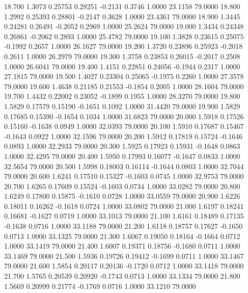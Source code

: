   18.700   1.3073   0.25753   0.28251  -0.2131   0.3746   1.0000  23.1158  79.0000
  18.800   1.2992   0.25393   0.28801  -0.2147   0.3628   1.0000  23.4361  79.0000
  18.900   1.3445   0.24281   0.26491  -0.2052   0.2969   1.0000  25.2624  79.0000
  19.000   1.3434   0.24348   0.26861  -0.2062   0.2893   1.0000  25.4782  79.0000
  19.100   1.3828   0.23615   0.25075  -0.1992   0.2657   1.0000  26.1627  79.0000
  19.200   1.3720   0.23896   0.25923  -0.2018   0.2611   1.0000  26.2979  79.0000
  19.300   1.3758   0.23853   0.26015  -0.2017   0.2508   1.0000  26.6041  79.0000
  19.400   1.4151   0.22851   0.24056  -0.1944   0.2317   1.0000  27.1815  79.0000
  19.500   1.4027   0.23304   0.25065  -0.1975   0.2260   1.0000  27.3578  79.0000
  19.600   1.4638   0.21185   0.21553  -0.1854   0.2005   1.0000  28.1604  79.0000
  19.700   1.4432   0.22002   0.23052  -0.1899   0.1955   1.0000  28.3270  79.0000
  19.800   1.5829   0.17579   0.15190  -0.1651   0.1092   1.0000  31.4420  79.0000
  19.900   1.5829   0.17685   0.15390  -0.1654   0.1034   1.0000  31.6823  79.0000
  20.000   1.5918   0.17526   0.15160  -0.1638   0.0949   1.0000  32.0393  79.0000
  20.100   1.5910   0.17687   0.15467  -0.1643   0.0922   1.0000  32.1596  79.0000
  20.200   1.5912   0.17819   0.15724  -0.1646   0.0893   1.0000  32.2933  79.0000
  20.300   1.5925   0.17923   0.15931  -0.1648   0.0863   1.0000  32.4295  79.0000
  20.400   1.5950   0.17993   0.16077  -0.1647   0.0833   1.0000  32.5654  79.0000
  20.500   1.5998   0.18003   0.16114  -0.1644   0.0803   1.0000  32.7044  79.0000
  20.600   1.6241   0.17510   0.15327  -0.1603   0.0745   1.0000  32.9753  79.0000
  20.700   1.6265   0.17609   0.15524  -0.1603   0.0734   1.0000  33.0282  79.0000
  20.800   1.6249   0.17800   0.15875  -0.1610   0.0728   1.0000  33.0559  79.0000
  20.900   1.6226   0.18011   0.16262  -0.1618   0.0724   1.0000  33.0802  79.0000
  21.000   1.6197   0.18241   0.16681  -0.1627   0.0719   1.0000  33.1013  79.0000
  21.100   1.6161   0.18489   0.17135  -0.1638   0.0716   1.0000  33.1188  79.0000
  21.200   1.6118   0.18757   0.17627  -0.1650   0.0713   1.0000  33.1325  79.0000
  21.300   1.6067   0.19050   0.18164  -0.1664   0.0712   1.0000  33.1419  79.0000
  21.400   1.6007   0.19371   0.18756  -0.1680   0.0711   1.0000  33.1469  79.0000
  21.500   1.5936   0.19726   0.19412  -0.1699   0.0711   1.0000  33.1467  79.0000
  21.600   1.5854   0.20117   0.20136  -0.1720   0.0712   1.0000  33.1418  79.0000
  21.700   1.5765   0.20539   0.20920  -0.1743   0.0713   1.0000  33.1334  79.0000
  21.800   1.5669   0.20999   0.21774  -0.1769   0.0716   1.0000  33.1210  79.0000
